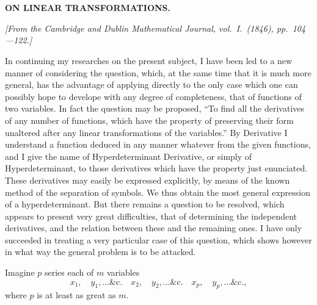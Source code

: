 \documentclass[11pt,a4paper]{article}
\theoremstyle{plain}
\theoremstyle{definition}
\theoremstyle{remark}
\begin{document}
\newpage
\setcounter{section}{13}


\section{}
\begin{center}
\textbf{ON LINEAR TRANSFORMATIONS.}
\end{center}
\textit{[From the Cambridge and Dublin Mathematical Journal, vol.\ I.\ (1846), pp.\ 104---122.]}

In continuing my researches on the present subject, I have been led to a new
manner of considering the question, which, at the same time that it is much more
general, has the advantage of applying directly to the only case which one can
possibly hope to develope with any degree of completeness, that of functions of two
variables. In fact the question may be proposed, ``To find all the derivatives of any
number of functions, which have the property of preserving their form unaltered after
any linear transformations of the variables.'' By Derivative I understand a function
deduced in any manner whatever from the given functions, and I give the name of
Hyperdeterminant Derivative, or simply of Hyperdeterminant, to those derivatives which
have the property just enunciated. These derivatives may easily be expressed explicitly,
by means of the known method of the separation of symbols. We thus obtain the
most general expression of a hyperdeterminant. But there remains a question to be
resolved, which appears to present very great difficulties, that of determining the
independent derivatives, and the relation between these and the remaining ones. I
have only succeeded in treating a very particular case of this question, which shows
however in what way the general problem is to be attacked.

Imagine $p$ series each of $m$ variables
\[
x_1, \quad y_1, \ldots \&\text{c.} \quad x_2, \quad y_2, \ldots \&\text{c.} \quad x_p, \quad y_p, \ldots \&\text{c.},
\]
where $p$ is at least as great as $m$.
\end{document}
